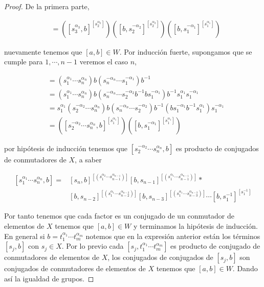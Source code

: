 \begin{proof}
De la primera parte, 

\begin{align*}
[s_1^{\alpha_1}s_2^{\alpha_2}s_3^{\alpha_3},b] & = ([s_3^{\alpha_3},b]^{[s_2^{\alpha_2}]})([b,s_2^{-\alpha_2}]^{[s_2^{\alpha_2}]})([b,s_1^{-\alpha_1}]^{[s_1^{\alpha_1}]})
\end{align*}

nuevamente tenemos que $[a,b] \in W.$ Por inducción fuerte, supongamos que se cumple para $1, \cdots, n-1$ veremos el caso $n$,

\begin{align*}
[s_1^{\alpha_1} \cdots s_n^{\alpha_n},b] & =(s_1^{\alpha_1} \cdots s_n^{\alpha_n})b(s_n^{-\alpha_n} \cdots s_1^{-\alpha_1})b^{-1} \\
& = (s_1^{\alpha_1} \cdots s_n^{\alpha_n})b(s_n^{-\alpha_n} \cdots s_2^{-\alpha_2 }b^{-1}b s_1^{-\alpha_1})b^{-1}s_1^{\alpha_1}s_1^{-\alpha_1} \\
& = s_1^{\alpha_1}( s_2^{-\alpha_2 } \cdots s_n^{\alpha_n})b(s_n^{-\alpha_n} \cdots s_2^{-\alpha_2 })b^{-1}(b s_1^{-\alpha_1}b^{-1}s_1^{\alpha_1})s_1^{-\alpha_1} \\
& = ([ s_2^{-\alpha_2 } \cdots s_n^{\alpha_n},b]^{[s_1^{\alpha_1}]})([b,s_1^{-\alpha_1}]^{[s_1^{\alpha_1}]})
\end{align*}



por hipótesis de inducción tenemos que $[ s_2^{-\alpha_2 } \cdots s_n^{\alpha_n},b]$ es producto de conjugados de conmutadores de $X$, a saber

\begin{align*}\label{eq:induccion}
[s_1^{\alpha_1} \cdots s_n^{\alpha_n},b]  = & [s_n,b]^{[(s_1^{\alpha_2 } \cdots s_{n-1}^{\alpha_{n-1}})]}[b,s_{n-1}]^{[(s_1^{\alpha_1 } \cdots s_{n-1}^{\alpha_{n-1}})]} * \\ 
& [b,s_{n-2}]^{[(s_1^{\alpha_1 } \cdots s_{n-2}^{\alpha_{n-2}})]} [b,s_{n-3}]^{[(s_1^{\alpha_1 } \cdots s_{n-3}^{\alpha_{n-3}})]} \cdots [b,s_1^{-1}]^{[s_1^{-1}]}
\end{align*}

Por tanto tenemos que cada factor es un conjugado  de un conmutador de elementos de $X$ tenemos que $[a,b] \in W$ y terminamos la hipótesis de inducción. En general si $b=t_1^{\alpha_1} \cdots t_m^{\alpha_m}$ notemos que en la expresión anterior están los términos $[s_j,b]$ con $s_j \in X$. Por lo previo cada $[s_j,t_1^{\alpha_1} \cdots t_m^{\alpha_m}]$ es producto de conjugado de conmutadores de elementos de $X$, los conjugados de conjugados de $[s_j,b]$ son  conjugados de conmutadores de elementos de $X$ tenemos que $[a,b] \in W.$ Dando así la igualdad de grupos. 

\end{proof}

